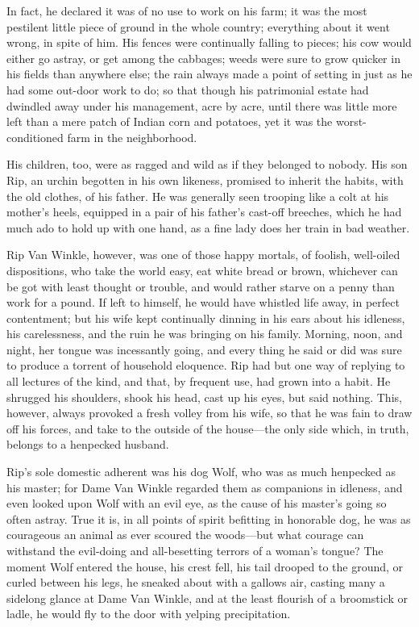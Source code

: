 In fact, he declared it was of no use to work on his farm; it was the most pestilent little piece of ground in the whole country; everything about it went wrong, in spite of him. His fences were continually falling to pieces; his cow would either go astray, or get among the cabbages; weeds were sure to grow quicker in his fields than anywhere else; the rain always made a point of setting in just as he had some out-door work to do; so that though his patrimonial estate had dwindled away under his management, acre by acre, until there was little more left than a mere patch of Indian corn and potatoes, yet it was the worst-conditioned farm in the neighborhood.

His children, too, were as ragged and wild as if they belonged to nobody. His son Rip, an urchin begotten in his own likeness, promised to inherit the habits, with the old clothes, of his father. He was generally seen trooping like a colt at his mother’s heels, equipped in a pair of his father’s cast-off breeches, which he had much ado to hold up with one hand, as a fine lady does her train in bad weather.

Rip Van Winkle, however, was one of those happy mortals, of foolish, well-oiled dispositions, who take the world easy, eat white bread or brown, whichever can be got with least thought or trouble, and would rather starve on a penny than work for a pound. If left to himself, he would have whistled life away, in perfect contentment; but his wife kept continually dinning in his ears about his idleness, his carelessness, and the ruin he was bringing on his family. Morning, noon, and night, her tongue was incessantly going, and every thing he said or did was sure to produce a torrent of household eloquence. Rip had but one way of replying to all lectures of the kind, and that, by frequent use, had grown into a habit. He shrugged his shoulders, shook his head, cast up his eyes, but said nothing. This, however, always provoked a fresh volley from his wife, so that he was fain to draw off his forces, and take to the outside of the house—the only side which, in truth, belongs to a henpecked husband.

Rip’s sole domestic adherent was his dog Wolf, who was as much henpecked as his master; for Dame Van Winkle regarded them as companions in idleness, and even looked upon Wolf with an evil eye, as the cause of his master’s going so often astray. True it is, in all points of spirit befitting in honorable dog, he was as courageous an animal as ever scoured the woods—but what courage can withstand the evil-doing and all-besetting terrors of a woman’s tongue? The moment Wolf entered the house, his crest fell, his tail drooped to the ground, or curled between his legs, he sneaked about with a gallows air, casting many a sidelong glance at Dame Van Winkle, and at the least flourish of a broomstick or ladle, he would fly to the door with yelping precipitation.

